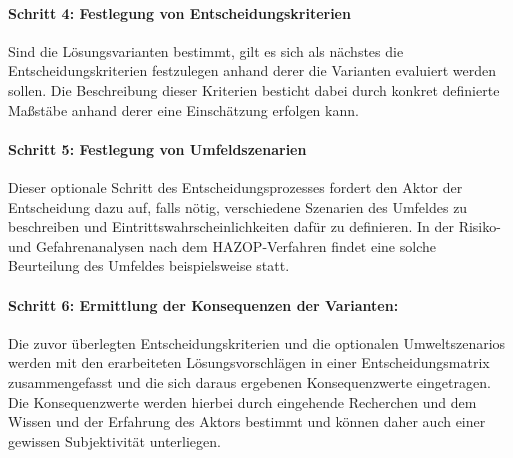 \paragraph{Schritt 4: Festlegung von Entscheidungskriterien} Sind die Lösungsvarianten bestimmt, gilt es sich als nächstes die Entscheidungskriterien festzulegen anhand derer die Varianten evaluiert werden sollen. Die Beschreibung dieser Kriterien besticht dabei durch konkret definierte Maßstäbe anhand derer eine Einschätzung erfolgen kann.
\vspace*{-2.5mm}
\paragraph{Schritt 5: Festlegung von Umfeldszenarien} Dieser optionale Schritt des Entscheidungsprozesses fordert den Aktor der Entscheidung dazu auf, falls nötig, verschiedene Szenarien des Umfeldes zu beschreiben und Eintrittswahrscheinlichkeiten dafür zu definieren. In der Risiko- und Gefahrenanalysen nach dem HAZOP-Verfahren findet eine solche Beurteilung des Umfeldes beispielsweise statt. 
\vspace*{-2.5mm}
\paragraph{Schritt 6: Ermittlung der Konsequenzen der Varianten:} Die zuvor überlegten Entscheidungskriterien und die optionalen Umweltszenarios werden mit den erarbeiteten Lösungsvorschlägen in einer Entscheidungsmatrix zusammengefasst und die sich daraus ergebenen Konsequenzwerte eingetragen. Die Konsequenzwerte werden hierbei durch eingehende Recherchen und dem Wissen und der Erfahrung des Aktors bestimmt und können daher auch einer gewissen Subjektivität unterliegen.
\vspace*{-2.5mm}
